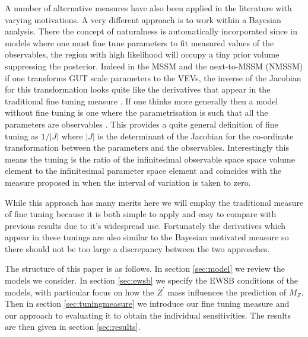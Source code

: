 \documentclass[preprint,amsmath,amssymb,aps,superscriptaddress,prd,showpacs,floatfix,nofootinbib]{revtex4-1}
\begin{document}
A number of alternative measures have also been applied in the
literature \cite{Anderson:1994dz, Anderson:1994tr, Anderson:1995cp,
  Anderson:1996ew, Ciafaloni:1996zh, Chan:1997bi, Barbieri:1998uv,
  Giusti:1998gz, Casas:2003jx, Casas:2004uu, Casas:2004gh,
  Casas:2006bd, Kitano:2005wc, Athron:2007ry, Athron:2007qr,
  Baer:2012up} with varying motivations.  A very different approach is
to work within a Bayesian analysis.  There the concept of naturalness
is automatically incorporated since in models where one must fine tune
parameters to fit measured values of the observables, the region with
high likelihood will occupy a tiny prior volume \cite{Allanach:2007qk,
  Cabrera:2008tj, Ghilencea:2012gz, Ghilencea:2012qk, Fichet:2012sn,
  Kim:2013uxa} suppressing the posterior.  Indeed in the MSSM and
the next-to-MSSM (NMSSM) if one transforms GUT scale parameters to the VEVs, the inverse
of the Jacobian for this transformation looks quite like the
derivatives that appear in the traditional fine tuning measure
\cite{Allanach:2007qk, Cabrera:2008tj, Kim:2013uxa}.  If one thinks
more generally then a model without fine tuning is one where the
parametrisation is such that all the parameters are observables
\cite{Fichet:2012sn, Kim:2013uxa}.  This provides a quite general
definition of fine tuning as $1/|J|$ where $|J|$ is the determinant of
the Jacobian for the co-ordinate transformation between the parameters
and the observables. Interestingly this means the tuning is the ratio
of the infinitesimal observable space space volume element to the
infinitesimal parameter space element and coincides with the measure
proposed in \cite{Athron:2007ry} when the interval of variation is
taken to zero.

While this approach has many merits here we will employ the traditional
measure of fine tuning because it is both simple to apply and easy to
compare with previous results due to it's widespread use.  Fortunately
the derivatives which appear in these tunings are also similar to the
Bayesian motivated measure so there should not be too large a
discrepancy between the two approaches.


The structure of this paper is as follows.  In section \ref{sec:model}
we review the models we consider.  In section \ref{sec:ewsb} we
specify the EWSB conditions of the models, with particular focus on
how the $Z^\prime$ mass influences the prediction of $M_Z$.  Then in
section \ref{sec:tuningmeasure} we introduce our fine tuning measure
and our approach to evaluating it to obtain the individual
sensitivities.  The results are then given in section
\ref{sec:results}.
\end{document}
